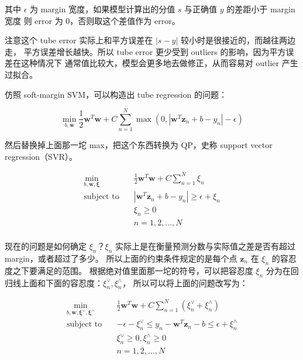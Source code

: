 \documentclass[a4paper]{article}
\begin{document}
其中 $\epsilon$ 为 margin 宽度，如果模型计算出的分值 $s$ 与正确值 $y$ 的差距小于 margin 宽度
则 error 为 0，否则取这个差值作为 error。

注意这个 tube error 实际上和平方误差在 $|s-y|$ 较小时是很接近的，而越往两边走，
平方误差增长越快。所以 tube error 更少受到 outliers 的影响，因为平方误差在这种情况下
通常值比较大，模型会更多地去做修正，从而容易对 outlier 产生过拟合。

仿照 soft-margin SVM，可以构造出 tube regression 的问题：

$$\operatorname*{min}_{b, \mathbf{w}}\frac{1}{2}\mathbf{w}^T\mathbf{w} + C\sum_{n=1}^{N} \operatorname*{max} (0, |\mathbf{w}^T\mathbf{z}_n + b - y_n| - \epsilon)$$

然后替换掉上面那一坨 max，把这个东西转换为 QP，史称 support vector regression（SVR）。

\begin{equation}
\begin{aligned}
\min_{b, \mathbf{w}, \bm{\xi}} \quad & \frac{1}{2}\mathbf{w}^{T}\mathbf{w} + C \sum_{n=1}^{N}\xi_n \\
\text{subject to} \quad & |\mathbf{w}^{T}\mathbf{z}_n + b - y_n| \ge \epsilon + \xi_n \\
& \xi_n \ge 0 \\
& n = 1, 2, \dots, N \\
\end{aligned}
\end{equation}

现在的问题是如何确定 $\xi_n$？$\xi_n$ 实际上是在衡量预测分数与实际值之差是否有超过 margin，或者超过了多少。
所以上面的约束条件规定的是每个点 $\mathbf{z}_n$ 在 $\xi_n$ 的容忍度之下要满足的范围。
根据绝对值里面那一坨的符号，可以把容忍度 $\xi_n$ 分为在回归线上面和下面的容忍度：$\xi_n^{\vee}, \xi_n^{\wedge}$，
所以可以将上面的问题改写为：

\begin{equation}
\begin{aligned}
\min_{b, \mathbf{w}, \bm{\xi}^{\vee}, \bm{\xi}^{\wedge}} \quad & \frac{1}{2}\mathbf{w}^{T}\mathbf{w} + C \sum_{n=1}^{N}(\xi_n^{\vee} + \xi_n^{\wedge}) \\
\text{subject to} \quad & -\epsilon - \xi_n^{\vee} \le y_n - \mathbf{w}^{T}\mathbf{z}_n - b \le \epsilon + \xi_n^{\wedge} \\
& \xi_n^{\vee} \ge 0, \xi_n^{\wedge} \ge 0 \\
& n = 1, 2, \dots, N \\
\end{aligned}
\end{equation}
\end{document}
